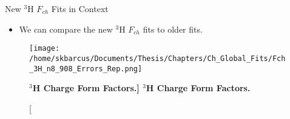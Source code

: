 \documentclass[10pt]{beamer}
\begin{document}
\begin{frame}[fragile]{New $^3$H $F_{ch}$ Fits in Context}

	\begin{itemize}
		\item We can compare the new $^3$H $F_{ch}$ fits to older fits.
	\end{itemize}
	
	\vspace{-2mm}
	\begin{figure}[!ht]
	\begin{center}
	\texttt{[image: /home/skbarcus/Documents/Thesis/Chapters/Ch\_Global\_Fits/Fch\_3H\_n8\_908\_Errors\_Rep.png]}
	\end{center}
	\caption[\bf{$^3$H Charge Form Factors.}]{
	{\bf{$^3$H Charge Form Factors.}} }
	\label{fig:3h_fch}
	\end{figure}

\end{frame}
\end{document}
